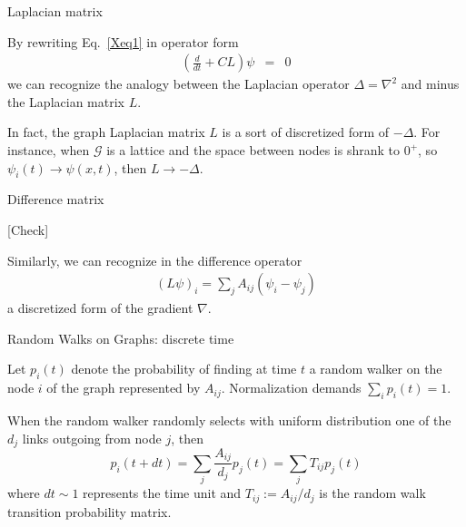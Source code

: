 \documentclass{beamer}
\newcommand{\comment}[1]{{\color{red}[#1]}}
\begin{document}

\begin{frame}{Laplacian matrix}

By rewriting Eq.~\ref{Xeq1} in operator form
\begin{eqnarray}
\left(
\frac{d}{dt}
+
C
L
\right)
\psi
&=&
0
\end{eqnarray}
we can recognize the analogy between the Laplacian operator $\Delta = \nabla^2$ and minus the Laplacian matrix $L$.

\vspace{0.25cm}

In fact, the graph Laplacian matrix $L$ is a sort of discretized form of $-\Delta$.
For instance, when $\mathcal{G}$ is a lattice and the space between nodes is shrank to $0^+$, so $\psi_i(t) \to \psi(x,t)$, then $L\to -\Delta$.

\end{frame}



\begin{frame}{Difference matrix}

\comment{Check}

Similarly, we can recognize in the difference operator
\begin{eqnarray}
(L \psi)_i
=
\sum_j 
A_{ij}
(\psi_i-\psi_j)
\end{eqnarray}
a discretized form of the gradient $\nabla$.

\end{frame}


\begin{frame}{Random Walks on Graphs: discrete time}

Let $p_i(t)$ denote the probability of finding at time $t$ a random walker on the node $i$ of the graph represented by $A_{ij}$.
Normalization demands $\sum_i p_i(t)=1$.

\vspace{0.25cm}

When the random walker randomly selects with uniform distribution one of the $d_j$ links outgoing from node $j$, then
\begin{equation}
p_i(t+dt)
=
\sum_j 
\frac{
A_{ij}
}{
d_j
}
p_j(t)
=
\sum_j 
T_{ij}
p_j(t)
\end{equation}
where $dt \sim 1$ represents the time unit and $T_{ij}:=A_{ij}/d_j$ is the random walk transition probability matrix.
\end{frame}
\end{document}
